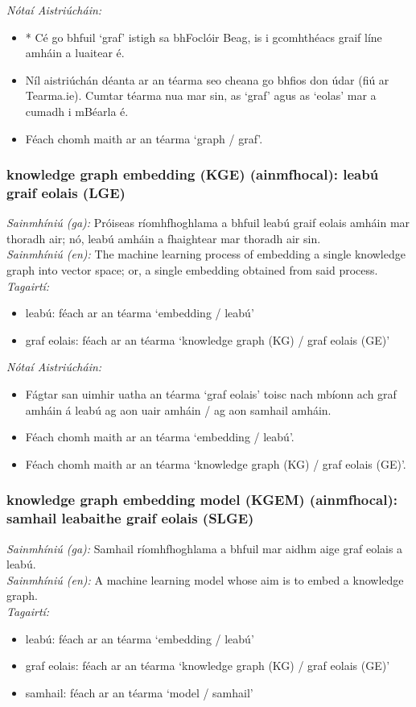  \noindent \textit{Nótaí Aistriúcháin:}
\begin{itemize}
	\item * Cé go bhfuil `graf' istigh sa bhFoclóir Beag, is i gcomhthéacs graif líne amháin a luaitear é.
	\item Níl aistriúchán déanta ar an téarma seo cheana go bhfios don údar (fiú ar Tearma.ie). Cumtar téarma nua mar sin, as `graf' agus as `eolas' mar a cumadh i mBéarla é.
	\item Féach chomh maith ar an téarma `graph / graf'.
\end{itemize}


\subsubsection*{knowledge graph embedding (KGE) (ainmfhocal): leabú graif eolais (LGE)}
 \noindent \textit{Sainmhíniú (ga):} Próiseas ríomhfhoghlama a bhfuil leabú graif eolais amháin mar thoradh air; nó, leabú amháin a fhaightear mar thoradh air sin.
\\
 \noindent \textit{Sainmhíniú (en):} The machine learning process of embedding a single knowledge graph into vector space; or, a single embedding obtained from said process.
\\
 \noindent \textit{Tagairtí:}
\begin{itemize}
	\item leabú: féach ar an téarma `embedding / leabú'
	\item graf eolais: féach ar an téarma `knowledge graph (KG) / graf eolais (GE)'
\end{itemize}

 \noindent \textit{Nótaí Aistriúcháin:}
\begin{itemize}
	\item Fágtar san uimhir uatha an téarma `graf eolais' toisc nach mbíonn ach graf amháin á leabú ag aon uair amháin / ag aon samhail amháin.
	\item Féach chomh maith ar an téarma `embedding / leabú'.
	\item Féach chomh maith ar an téarma `knowledge graph (KG) / graf eolais (GE)'.
\end{itemize}


\subsubsection*{knowledge graph embedding model (KGEM) (ainmfhocal): samhail leabaithe graif eolais (SLGE)}
 \noindent \textit{Sainmhíniú (ga):} Samhail ríomhfhoghlama a bhfuil mar aidhm aige graf eolais a leabú.
\\
 \noindent \textit{Sainmhíniú (en):} A machine learning model whose aim is to embed a knowledge graph.
\\
 \noindent \textit{Tagairtí:}
\begin{itemize}
	\item leabú: féach ar an téarma `embedding / leabú'
	\item graf eolais: féach ar an téarma `knowledge graph (KG) / graf eolais (GE)'
	\item samhail: féach ar an téarma `model / samhail'
\end{itemize}

